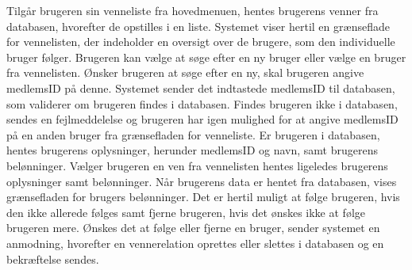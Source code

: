 \noindent
Tilgår brugeren sin venneliste fra hovedmenuen, hentes brugerens venner fra databasen, hvorefter de opstilles i en liste. Systemet viser hertil en grænseflade for vennelisten, der indeholder en oversigt over de brugere, som den individuelle bruger følger. Brugeren kan vælge at søge efter en ny bruger eller vælge en bruger fra vennelisten. Ønsker brugeren at søge efter en ny, skal brugeren angive medlemsID på denne. Systemet sender det indtastede medlemsID til databasen, som validerer om brugeren findes i databasen. Findes brugeren ikke i databasen, sendes en fejlmeddelelse og brugeren har igen mulighed for at angive medlemsID på en anden bruger fra grænsefladen for venneliste. Er brugeren i databasen, hentes brugerens oplysninger, herunder medlemsID og navn, samt brugerens belønninger. Vælger brugeren en ven fra vennelisten hentes ligeledes brugerens oplysninger samt belønninger. Når brugerens data er hentet fra databasen, vises grænsefladen for brugers belønninger. Det er hertil muligt at følge brugeren, hvis den ikke allerede følges samt fjerne brugeren, hvis det ønskes ikke at følge brugeren mere. Ønskes det at følge eller fjerne en bruger, sender systemet en anmodning, hvorefter en vennerelation oprettes eller slettes i databasen og en bekræftelse sendes. 




